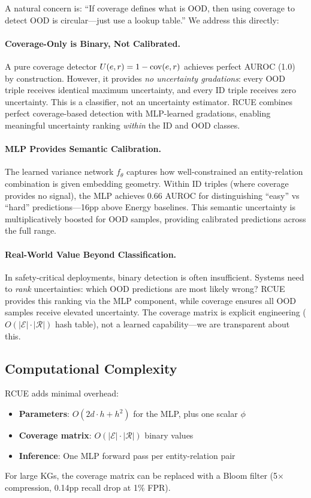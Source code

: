 A natural concern is: ``If coverage defines what is OOD, then using coverage to detect OOD is circular---just use a lookup table.'' We address this directly:

\paragraph{Coverage-Only is Binary, Not Calibrated.}
A pure coverage detector $U(e,r) = 1 - \mathrm{cov}(e,r)$ achieves perfect AUROC (1.0) by construction. However, it provides \emph{no uncertainty gradations}: every OOD triple receives identical maximum uncertainty, and every ID triple receives zero uncertainty. This is a classifier, not an uncertainty estimator. RCUE combines perfect coverage-based detection with MLP-learned gradations, enabling meaningful uncertainty ranking \emph{within} the ID and OOD classes.

\paragraph{MLP Provides Semantic Calibration.}
The learned variance network $f_\theta$ captures how well-constrained an entity-relation combination is given embedding geometry. Within ID triples (where coverage provides no signal), the MLP achieves 0.66 AUROC for distinguishing ``easy'' vs ``hard'' predictions---16pp above Energy baselines. This semantic uncertainty is multiplicatively boosted for OOD samples, providing calibrated predictions across the full range.

\paragraph{Real-World Value Beyond Classification.}
In safety-critical deployments, binary detection is often insufficient. Systems need to \emph{rank} uncertainties: which OOD predictions are most likely wrong? RCUE provides this ranking via the MLP component, while coverage ensures all OOD samples receive elevated uncertainty. The coverage matrix is explicit engineering ($O(|\mathcal{E}| \cdot |\mathcal{R}|)$ hash table), not a learned capability---we are transparent about this.

\subsection{Computational Complexity}

RCUE adds minimal overhead:
\begin{itemize}
    \item \textbf{Parameters}: $O(2d \cdot h + h^2)$ for the MLP, plus one scalar $\phi$
    \item \textbf{Coverage matrix}: $O(|\mathcal{E}| \cdot |\mathcal{R}|)$ binary values
    \item \textbf{Inference}: One MLP forward pass per entity-relation pair
\end{itemize}

For large KGs, the coverage matrix can be replaced with a Bloom filter (5$\times$ compression, 0.14pp recall drop at 1\% FPR).
